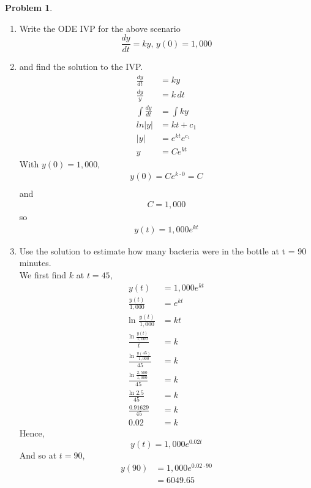 \documentclass[10pt,leqno ]{article}
\theoremstyle{definition}
\newtheorem{problem}[theorem]{Problem}
\begin{document}
\begin{problem}
\begin{enumerate}
\item Write the ODE IVP for the above scenario
\begin{equation*}
\frac{dy}{dt} = ky, \, y(0) = 1,000
\end{equation*}
\item and find the solution to the IVP.
\begin{align*}
    \frac{dy}{dt} &= ky \\
    \frac{dy}{y} &= k\, dt \\
    \int \frac{dy}{dt} &= \int ky \\
    ln |y| &= kt + c_1 \\
    |y| &= e^{kt}e^{c_1} \\
    y &= Ce^{kt}
\end{align*}
With $y(0) = 1,000$,
\begin{align*}
y(0) = Ce^{k \cdot 0} = C \\
\end{align*}
and
\begin{align*}
C = 1,000
\end{align*}
so
\begin{align*}
y(t) = 1,000 e^{kt}
\end{align*}
\item Use the solution to estimate how many bacteria were in the bottle at t = 90 minutes.
\\
We first find $k$ at $t = 45$,
\begin{align*}
y(t) &= 1,000e^{kt} \\
\frac{y(t)}{1,000} &= e^{kt} \\
\text{ln } \frac{y(t)}{1,000} &= kt \\
\frac{\text{ln } \frac{y(t)}{1,000}}{t} &= k \\
\frac{\text{ln } \frac{y(45)}{1,000}}{45} &= k \\
\frac{\text{ln } \frac{2,500}{1,000}}{45} &= k \\
\frac{\text{ln } 2.5}{45} &= k \\
\frac{0.91629}{45} &= k \\
0.02 &= k
\end{align*}
Hence,
\begin{equation*}
y(t) = 1,000e^{0.02t}
\end{equation*}
And so at $t = 90$,
\begin{align*}
y(90) &= 1,000 e^{0.02 \cdot 90} \\
         &= 6049.65
\end{align*}
\end{enumerate}


\end{problem}
\end{document}
